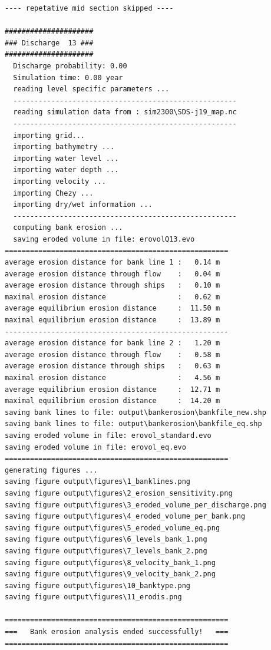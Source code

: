 \begin{Verbatim}
---- repetative mid section skipped ----

#####################
### Discharge  13 ###
#####################
  Discharge probability: 0.00
  Simulation time: 0.00 year
  reading level specific parameters ...
  -----------------------------------------------------
  reading simulation data from : sim2300\SDS-j19_map.nc
  -----------------------------------------------------
  importing grid...
  importing bathymetry ...
  importing water level ...
  importing water depth ...
  importing velocity ...
  importing Chezy ...
  importing dry/wet information ...
  -----------------------------------------------------
  computing bank erosion ...
  saving eroded volume in file: erovolQ13.evo
=====================================================
average erosion distance for bank line 1 :   0.14 m
average erosion distance through flow    :   0.04 m
average erosion distance through ships   :   0.10 m
maximal erosion distance                 :   0.62 m
average equilibrium erosion distance     :  11.50 m
maximal equilibrium erosion distance     :  13.89 m
-----------------------------------------------------
average erosion distance for bank line 2 :   1.20 m
average erosion distance through flow    :   0.58 m
average erosion distance through ships   :   0.63 m
maximal erosion distance                 :   4.56 m
average equilibrium erosion distance     :  12.71 m
maximal equilibrium erosion distance     :  14.20 m
saving bank lines to file: output\bankerosion\bankfile_new.shp
saving bank lines to file: output\bankerosion\bankfile_eq.shp
saving eroded volume in file: erovol_standard.evo
saving eroded volume in file: erovol_eq.evo
=====================================================
generating figures ...
saving figure output\figures\1_banklines.png
saving figure output\figures\2_erosion_sensitivity.png
saving figure output\figures\3_eroded_volume_per_discharge.png
saving figure output\figures\4_eroded_volume_per_bank.png
saving figure output\figures\5_eroded_volume_eq.png
saving figure output\figures\6_levels_bank_1.png
saving figure output\figures\7_levels_bank_2.png
saving figure output\figures\8_velocity_bank_1.png
saving figure output\figures\9_velocity_bank_2.png
saving figure output\figures\10_banktype.png
saving figure output\figures\11_erodis.png

=====================================================
===   Bank erosion analysis ended successfully!   ===
=====================================================
\end{Verbatim}

